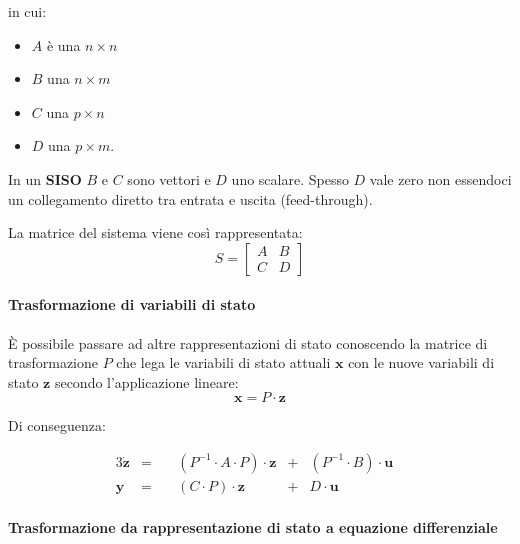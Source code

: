 \documentclass[11pt]{article}
\providecommand{\tightlist}{%
      \setlength{\itemsep}{0pt}\setlength{\parskip}{0pt}}
\begin{document}
in cui:

\begin{itemize}
\tightlist
\item
  \(A\) è una \(n \times n\)
\item
  \(B\) una \(n \times m\)
\item
  \(C\) una \(p \times n\)
\item
  \(D\) una \(p \times m\).
\end{itemize}

    In un \textbf{SISO} \(B\) e \(C\) sono vettori e \(D\) uno scalare.
Spesso \(D\) vale zero non essendoci un collegamento diretto tra entrata
e uscita (feed-through).

La matrice del sistema viene così rappresentata: \begin{equation}
    S = \left[
    \begin{array}{c|c}
      A & B\\
      \hline
      C & D
    \end{array}
    \right]
\end{equation}

    \hypertarget{trasformazione-di-variabili-di-stato}{%
\paragraph{Trasformazione di variabili di
stato}\label{trasformazione-di-variabili-di-stato}}

È possibile passare ad altre rappresentazioni di stato conoscendo la
matrice di trasformazione \(P\) che lega le variabili di stato attuali
\(\boldsymbol{x}\) con le nuove variabili di stato \(\boldsymbol{z}\)
secondo l'applicazione lineare: \begin{equation}
\boldsymbol{x} = P \cdot \boldsymbol{z}
\end{equation}

    Di conseguenza:

\begin{alignat*}{3}
\boldsymbol{\dot{z}} & ={} & \quad (P^{-1} \cdot A \cdot P) \cdot \boldsymbol{z} & +{} & (P^{-1} \cdot B) \cdot \boldsymbol{u} & \\
\boldsymbol{y} & ={} & \quad (C \cdot P) \cdot \boldsymbol{z}\ & +{} & D \cdot \boldsymbol{u}
\end{alignat*}

    \hypertarget{trasformazione-da-rappresentazione-di-stato-a-equazione-differenziale}{%
\paragraph{Trasformazione da rappresentazione di stato a equazione
differenziale}\label{trasformazione-da-rappresentazione-di-stato-a-equazione-differenziale}}
\end{document}
